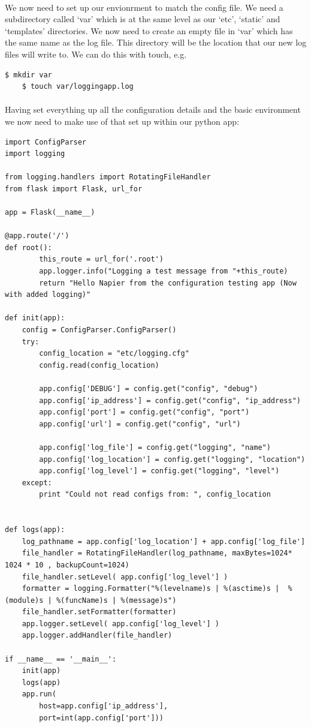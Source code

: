 \documentclass[12pt, a4paper, twoside]{book}
\begin{document}
\paragraph{} We now need to set up our envionrment to match the config file. We need a subdirectory called `var' which is at the same level as our `etc', `static' and `templates' directories. We now need to create an empty file in `var' which has the same name as the log file. This directory will be the location that our new log files will write to. We can do this with touch, e.g.

\begin{lstlisting}[style=DOS]
    $ mkdir var
    $ touch var/loggingapp.log
\end{lstlisting}

\paragraph{} Having set everything up all the configuration details and the basic environment we now need to make use of that set up within our python app:

\begin{lstlisting}
import ConfigParser
import logging

from logging.handlers import RotatingFileHandler
from flask import Flask, url_for

app = Flask(__name__)

@app.route('/')
def root():
        this_route = url_for('.root')
        app.logger.info("Logging a test message from "+this_route)
        return "Hello Napier from the configuration testing app (Now with added logging)" 

def init(app):
    config = ConfigParser.ConfigParser()
    try:
        config_location = "etc/logging.cfg"
        config.read(config_location)
        
        app.config['DEBUG'] = config.get("config", "debug")
        app.config['ip_address'] = config.get("config", "ip_address")
        app.config['port'] = config.get("config", "port")
        app.config['url'] = config.get("config", "url")

        app.config['log_file'] = config.get("logging", "name")
        app.config['log_location'] = config.get("logging", "location")
        app.config['log_level'] = config.get("logging", "level")
    except:
        print "Could not read configs from: ", config_location


def logs(app):
    log_pathname = app.config['log_location'] + app.config['log_file']
    file_handler = RotatingFileHandler(log_pathname, maxBytes=1024* 1024 * 10 , backupCount=1024)
    file_handler.setLevel( app.config['log_level'] )
    formatter = logging.Formatter("%(levelname)s | %(asctime)s |  %(module)s | %(funcName)s | %(message)s")
    file_handler.setFormatter(formatter)
    app.logger.setLevel( app.config['log_level'] )
    app.logger.addHandler(file_handler)

if __name__ == '__main__':
    init(app)
    logs(app)
    app.run(
        host=app.config['ip_address'], 
        port=int(app.config['port']))
\end{lstlisting}
\end{document}
